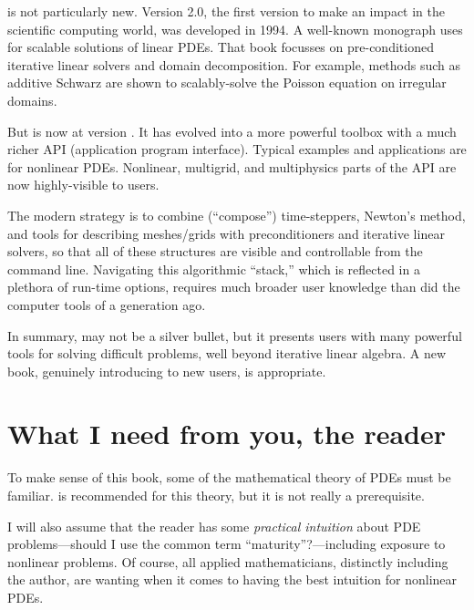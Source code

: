 \PETSc is not particularly new.  Version 2.0, the first version to make an impact in the scientific computing world, was developed in 1994.  A well-known monograph \citet{Smithetal1996} uses  for scalable solutions of linear PDEs.  That book focusses on pre-conditioned iterative linear solvers and domain decomposition.  For example, methods such as additive Schwarz are shown to scalably-solve the Poisson equation on irregular domains.

But \PETSc is now at version \PETSCVERSION.  It has evolved into a more powerful toolbox with a much richer API (application program interface).  Typical examples and applications are for nonlinear PDEs.  Nonlinear, multigrid, and multiphysics parts of the API are now highly-visible to users.

The modern \PETSc strategy is to combine (``compose'') time-steppers, Newton's method, and tools for describing meshes/grids with preconditioners and iterative linear solvers, so that all of these structures are visible and controllable from the command line.  Navigating this algorithmic ``stack,'' which is reflected in a plethora of run-time options, requires much broader user knowledge than did the computer tools of a generation ago.

In summary, \PETSc may not be a silver bullet, but it presents users with many powerful tools for solving difficult problems, well beyond iterative linear algebra.  A new book, genuinely introducing \PETSc to new users, is appropriate.


\section{What I need from you, the reader}

To make sense of this book, some of the mathematical theory of PDEs must be familiar.  \citet{Evans2010} is recommended for this theory, but it is not really a prerequisite.

I will also assume that the reader has some \emph{practical intuition} about PDE problems---should I use the common term ``maturity''?---including exposure to nonlinear problems.  Of course, all applied mathematicians, distinctly including the author, are wanting when it comes to having the best intuition for nonlinear PDEs.

